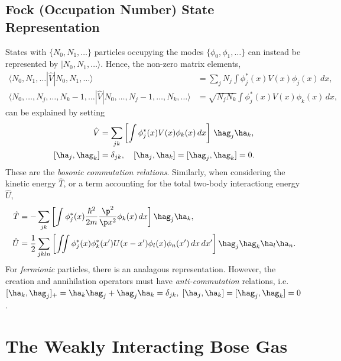\documentclass[qo.tex]{subfiles}
\begin{document}
\section{Fock (Occupation Number) State Representation}
States with $\{N_0,N_1,\dots\}$ particles occupying the modes $\{\phi_0,\phi_1,\dots\}$ can instead be represented by $|N_0,N_1,\dots\rangle$.
Hence, the non-zero matrix elements,
\begin{align}
    \langle N_0,N_1,\dots|\hat{V}|N_0,N_1,\dots\rangle &= \sum_j N_j \int \phi_j^*(x)V(x)\phi_j(x)\,dx, \\
    \langle N_0,\dots,N_j,\dots,N_k-1,\dots|\hat{V}|N_0,\dots,N_j-1,\dots,N_k,\dots\rangle &= \sqrt{N_jN_k}\int \phi_j^*(x)V(x)\phi_k(x)\,dx,
\end{align}
can be explained by setting
\begin{align}
    \hat{V} &= \sum_{jk}\left[\int \phi_j^*(x)V(x)\phi_k(x)\,dx\right]\,\hag_j\ha_k, \\
    [\ha_j,\hag_k] &= \delta_{jk},\quad [\ha_j,\ha_k] = [\hag_j,\hag_k] = 0.
\end{align}
These are the \emph{bosonic commutation relations}.
Similarly, when considering the kinetic energy $\hat{T}$, or a term accounting for the total two-body interactiong energy $\hat{U}$,
\begin{align}
    \hat{T} &= -\sum_{jk}\left[\int \phi_j^*(x)\frac{\hbar^2}{2m}\frac{\p^2}{\p x^2}\phi_k(x)\,dx\right]\hag_j\ha_k, \\
    \hat{U} &= \frac12\sum_{jkln}\left[\iint \phi_j^*(x)\phi_k^*(x')U(x-x')\phi_l(x)\phi_n(x')\,dx\,dx'\right]\hag_j\hag_k\ha_l\ha_n.
\end{align}
For \emph{fermionic} particles, there is an analagous representation. 
However, the creation and annihilation operators must have \emph{anti-commutation} relations, i.e. $[\ha_k,\hag_j]_+ = \ha_k\hag_j+\hag_j\ha_k = \delta_{jk},\; [\ha_j,\ha_k] = [\hag_j,\hag_k] = 0$.

\chapter{The Weakly Interacting Bose Gas}
\end{document}
